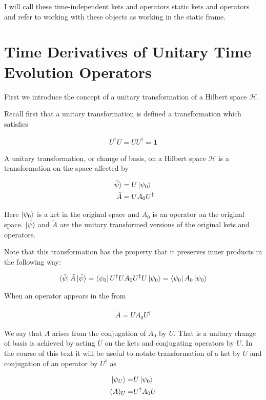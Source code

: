 \documentclass[12pt]{article}
\newcommand{\bv}[1]{\boldsymbol{#1}}
\begin{document}
I will call these time-independent kets and operators static kets and operators and refer to working with these objects as working in the static frame.

\section{Time Derivatives of Unitary Time Evolution Operators}
First we introduce the concept of a unitary transformation of a Hilbert space $\mathcal{H}$.

Recall first that a unitary transformation is defined a transformation which satisfies

\begin{align}
U^{\dag}U = UU^{\dag} = \bv{1}
\end{align}

A unitary transformation, or change of basis, on a Hilbert space $\mathcal{H}$ is a transformation on the space affected by

\begin{align}
\ket{\tilde{\psi}} &= U\ket{\psi_0}\\
\tilde{A} &= UA_0U^{\dag}
\end{align}

Here $\ket{\psi_0}$ is a ket in the original space and $A_0$ is an operator on the original space.
$\ket{\tilde{\psi}}$ and $\tilde{A}$ are the unitary transformed versions of the original kets and operators.

Note that this transformation has the property that it preserves inner products in the following way:

\begin{align}
\bra{\tilde{\psi}}\tilde{A}\ket{\tilde{\psi}} = \bra{\psi_0}U^{\dag}UA_0U^{\dag}U\ket{\psi_0} = \bra{\psi_0}A_0\ket{\psi_0}
\end{align}

When an operator appears in the from

\begin{align}
\tilde{A} = UA_0 U^{\dag}
\end{align}

We say that $\tilde{A}$ arises from the conjugation of $A_0$ by $U$.
That is a unitary change of basis is achieved by acting $U$ on the kets and conjugating operators by $U$.
In the course of this text it will be useful to notate transformation of a ket by $U$ and conjugation of an operator by $U^{\dag}$ as

\begin{align}
\ket{\psi_U} =& U\ket{\psi_0}\\
(A)_U =& U^{\dag}A_0U
\end{align}
\end{document}

